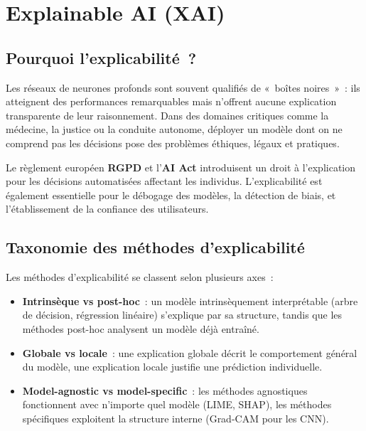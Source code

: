 \documentclass[a4paper,11pt,twoside]{book}
\begin{document}
\chapter{Explainable AI (XAI)}
\label{chap:xai}

\section{Pourquoi l'explicabilité~?}

Les réseaux de neurones profonds sont souvent qualifiés de «~boîtes noires~»~: ils atteignent des performances remarquables mais n'offrent aucune explication transparente de leur raisonnement. Dans des domaines critiques comme la médecine, la justice ou la conduite autonome, déployer un modèle dont on ne comprend pas les décisions pose des problèmes éthiques, légaux et pratiques.

Le règlement européen \textbf{RGPD} et l'\textbf{AI Act} introduisent un droit à l'explication pour les décisions automatisées affectant les individus. L'explicabilité est également essentielle pour le débogage des modèles, la détection de biais, et l'établissement de la confiance des utilisateurs.

\section{Taxonomie des méthodes d'explicabilité}

Les méthodes d'explicabilité se classent selon plusieurs axes~:

\begin{itemize}[leftmargin=2em]
  \item \textbf{Intrinsèque vs post-hoc}~: un modèle intrinsèquement interprétable (arbre de décision, régression linéaire) s'explique par sa structure, tandis que les méthodes post-hoc analysent un modèle déjà entraîné.
  \item \textbf{Globale vs locale}~: une explication globale décrit le comportement général du modèle, une explication locale justifie une prédiction individuelle.
  \item \textbf{Model-agnostic vs model-specific}~: les méthodes agnostiques fonctionnent avec n'importe quel modèle (LIME, SHAP), les méthodes spécifiques exploitent la structure interne (Grad-CAM pour les CNN).
\end{itemize}
\end{document}
